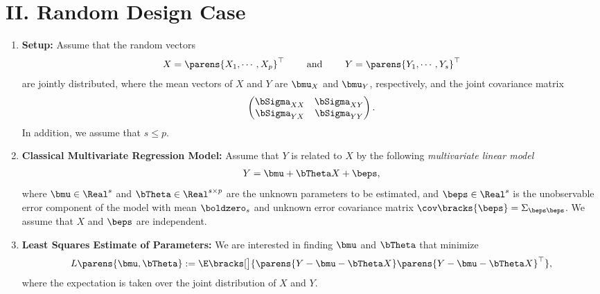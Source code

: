 \documentclass[12pt]{article}
\begin{document}
\section*{II. Random Design Case}

\begin{enumerate}[label=\textbf{\arabic*.}]

	\item \textbf{Setup:} Assume that the random vectors 
	\begin{align*}
		X = \parens{X_1, \cdots, X_p}^\top \qquad \text{ and } \qquad Y = \parens{Y_1, \cdots, Y_s}^\top
	\end{align*}
	are jointly distributed, where the mean vectors of $X$ and $Y$ are $\bmu_X$ and $\bmu_Y$, respectively, and the joint covariance matrix 
	\begin{align*}
		\begin{pmatrix}
			\bSigma_{XX} & \bSigma_{XY} \\ 
			\bSigma_{YX} & \bSigma_{YY}
		\end{pmatrix}. 
	\end{align*} 
	In addition, we assume that $s \le p$. 
	
	\item \textbf{Classical Multivariate Regression Model:} Assume that $Y$ is related to $X$ by the following \emph{multivariate linear model}  
	\begin{align}
		Y = \bmu + \bTheta X + \beps, 
	\end{align}  
	where $\bmu \in \Real^{s}$ and $\bTheta \in \Real^{s \times p}$ are the unknown parameters to be estimated, and $\beps \in \Real^{s}$ is the unobservable error component of the model with mean $\boldzero_s$ and unknown error covariance matrix $\cov \bracks{\beps} = \Sigma_{\beps \beps}$. We assume that $X$ and $\beps$ are independent. 
	
	\item \textbf{Least Squares Estimate of Parameters:} We are interested in finding $\bmu$ and $\bTheta$ that minimize 
	\begin{align}
		L \parens{\bmu, \bTheta} := \E \bracks[\big]{\parens{Y - \bmu - \bTheta X} \parens{Y - \bmu - \bTheta X}^\top}, 
	\end{align}
	where the expectation is taken over the joint distribution of $X$ and $Y$. 
	

\end{enumerate}
\end{document}
